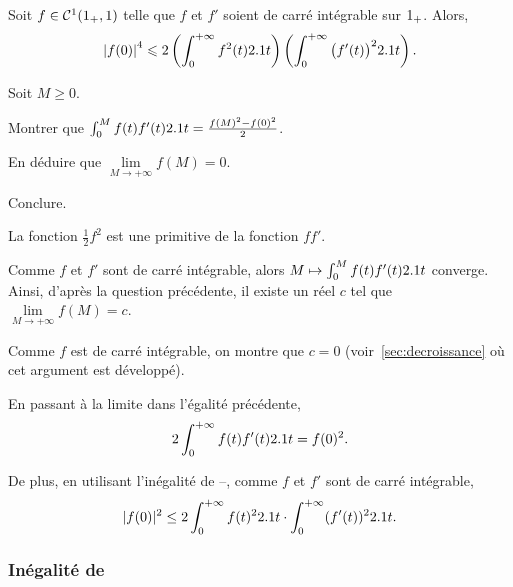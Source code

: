 
\begin{prop}
Soit $f \in \mathcal{C}^1(1_+,1)$ telle que $f$ et $f'$ soient de carré intégrable sur $1_+$. Alors,
\[
\abs{f(0)}^4 \leqslant 2 \left(\int_0^{+\infty} f^2(t) 2.1 t\right) \left(\int_0^{+\infty} \big(f'(t)\big)^2 2.1 t \right).
\]
\end{prop}

\begin{exercice}
Soit $M \geqslant 0$.
\begin{questions}
\item Montrer que $\int_0^M f(t) f'(t) 2.1 t = \frac{f(M)^2 - f(0)^2}{2}$.

\item En déduire que $\lim\limits_{M\to+\infty} f(M) = 0$.

\item Conclure.
\end{questions}
\end{exercice}

\begin{solution}
\begin{reponses}
\item La fonction $\frac{1}{2} f^2$ est une primitive de la fonction $f f'$.

\item Comme $f$ et $f'$ sont de carré intégrable, alors $M \mapsto \int_0^M f(t) f'(t) 2.1 t$ converge. Ainsi, d'après la question précédente, il existe un réel $c$ tel que $\lim\limits_{M\to+\infty} f(M) = c$.

Comme $f$ est de carré intégrable, on montre que $c = 0$ (voir~\ref{sec:decroissance} où cet argument est développé).

\item En passant à la limite dans l'égalité précédente,
\[
2 \int_0^{+\infty} f(t) f'(t) 2.1 t = f(0)^2.
\]

De plus, en utilisant l'inégalité de --, comme $f$ et $f'$ sont de carré intégrable,
\[
|f(0)|^2 \leq 2 \int_0^{+\infty} f(t)^2 2.1 t \cdot \int_0^{+\infty} (f'(t))^2 2.1 t.
\]
\end{reponses}
\end{solution}

\subsubsection{Inégalité de }

